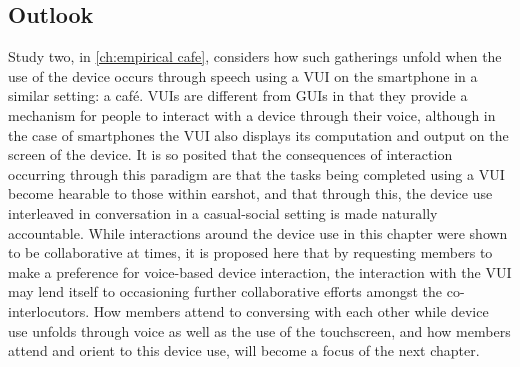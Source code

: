\crpagebreak\subsection{Outlook}\label{sec:empirical pub summary outlook}
\begin{revisedsubmission}
Study two, in \autoref{ch:empirical cafe}, considers how such gatherings unfold when the use of the device occurs through speech using a \acf{VUI} on the smartphone in a similar setting: a caf\'{e}.
\acp{VUI} are different from \acfp{GUI} in that they provide a mechanism for people to interact with a device through their voice, although in the case of smartphones the \ac{VUI} also displays its computation and output on the screen of the device.
It is so posited that the consequences of interaction occurring through this paradigm are that the tasks being completed using a \ac{VUI} become hearable to those within earshot, and that through this, the device use interleaved in conversation in a casual-social setting is made naturally accountable.
While interactions around the device use in this chapter were shown to be collaborative at times, it is proposed here that by requesting members to make a preference for voice-based device interaction, the interaction with the \ac{VUI} may lend itself to occasioning further collaborative efforts amongst the co-interlocutors.
How members attend to conversing with each other while device use unfolds through voice as well as the use of the touchscreen, and how members attend and orient to this device use, will become a focus of the next chapter. %
\end{revisedsubmission}


